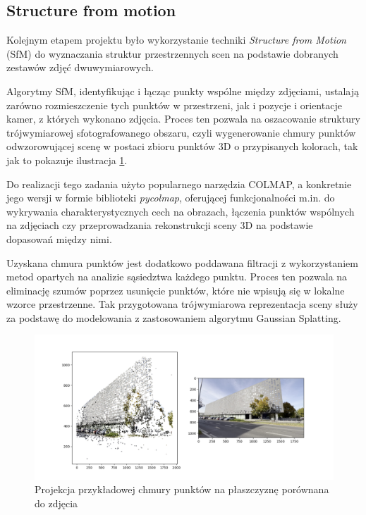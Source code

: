 \subsection{Structure from motion}
Kolejnym etapem projektu było wykorzystanie techniki \textit{Structure from Motion} (SfM) do wyznaczania
struktur przestrzennych scen na podstawie dobranych zestawów zdjęć dwuwymiarowych. 

Algorytmy SfM, identyfikując i łącząc 
punkty wspólne między zdjęciami, ustalają zarówno rozmieszczenie tych punktów w przestrzeni, jak i pozycje 
i orientacje kamer, z których wykonano zdjęcia. Proces ten pozwala na oszacowanie struktury trójwymiarowej
sfotografowanego obszaru, czyli wygenerowanie chmury punktów odwzorowującej scenę w postaci 
zbioru punktów 3D o przypisanych kolorach, tak jak to pokazuje ilustracja \ref{fig:sfm_ex}. 

Do realizacji tego zadania użyto popularnego narzędzia COLMAP, a konkretnie jego wersji w formie biblioteki 
\textit{pycolmap}, oferującej funkcjonalności m.in. do wykrywania charakterystycznych cech na obrazach, 
łączenia punktów wspólnych na zdjęciach czy przeprowadzania rekonstrukcji sceny 3D na podstawie dopasowań 
między nimi.

Uzyskana chmura punktów jest dodatkowo poddawana filtracji z wykorzystaniem metod opartych na analizie 
sąsiedztwa każdego punktu. Proces ten pozwala na eliminację szumów poprzez usunięcie punktów, które nie 
wpisują się w lokalne wzorce przestrzenne. Tak przygotowana trójwymiarowa reprezentacja sceny służy za 
podstawę do modelowania z zastosowaniem algorytmu Gaussian Splatting.

\begin{figure}[!ht]
    \centering
    \includegraphics[width=0.9\linewidth]{images/sfm.png}
    \caption{Projekcja przykładowej chmury punktów na płaszczyznę porównana do zdjęcia}
    \label{fig:sfm_ex}
\end{figure}